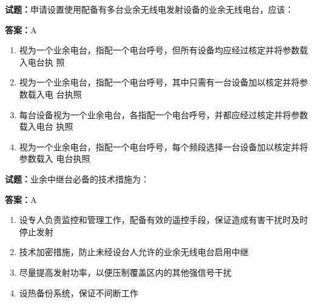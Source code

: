 \documentclass{ctexbook}
\begin{document}




\vspace{1em}

\textbf{试题：}申请设置使用配备有多台业余无线电发射设备的业余无线电台，应该： 

\textbf{答案：}A 

\begin{enumerate}[leftmargin=3em]
  \item 视为一个业余电台，指配一个电台呼号，但所有设备均应经过核定并将参数载入电台执
照 

  \item 视为一个业余电台，指配一个电台呼号，其中只需有一台设备加以核定并将参数载入电
台执照 

  \item 每台设备视为一个业余电台，各指配一个电台呼号，并都应经过核定并将参数载入电台
执照 

  \item 视为一个业余电台，指配一个电台呼号，每个频段选择一台设备加以核定并将参数载入
电台执照 

\end{enumerate}






\vspace{1em}

\textbf{试题：}业余中继台必备的技术措施为： 

\textbf{答案：}A 

\begin{enumerate}[leftmargin=3em]
  \item 设专人负责监控和管理工作，配备有效的遥控手段，保证造成有害干扰时及时停止发射 

  \item 技术加密措施，防止未经设台人允许的业余无线电台启用中继 

  \item 尽量提高发射功率，以便压制覆盖区内的其他强信号干扰 

  \item 设热备份系统，保证不间断工作 

\end{enumerate}



\end{document}
